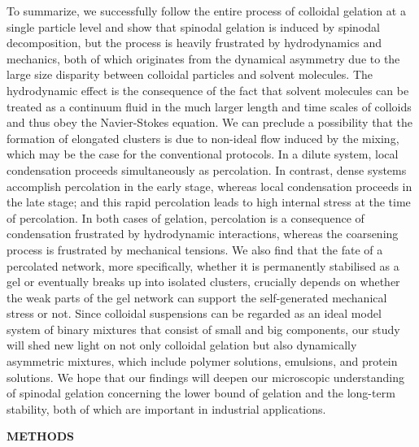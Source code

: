 \documentclass[preprint,footinbib,amsmath,amssymb]{revtex4}
\begin{document}
To summarize, we successfully follow the entire process of colloidal gelation at a single particle level and 
show that spinodal gelation is induced by spinodal decomposition, but the process is heavily frustrated  by 
hydrodynamics and mechanics, both of which originates from the dynamical asymmetry due to the large size disparity between 
colloidal particles and solvent molecules. The hydrodynamic effect is the consequence of the fact that solvent molecules 
can be treated as a continuum fluid in the much larger length and time scales of colloids and thus obey the Navier-Stokes equation. 
We can preclude a possibility that the formation of elongated clusters is due to non-ideal flow induced by the mixing, which may be the case for the conventional protocols. 
In a dilute system, local condensation proceeds simultaneously as percolation.
In contrast, dense systems accomplish percolation in the early stage, whereas local condensation proceeds in the late stage; and this rapid percolation leads to high internal stress at the time of percolation. 
In both cases of gelation, percolation is a consequence of condensation frustrated by hydrodynamic interactions, whereas the coarsening process is frustrated by mechanical tensions.
We also find that the fate of a percolated network, more specifically, whether it is permanently stabilised as a gel or eventually breaks up into isolated clusters, 
crucially depends on whether the weak parts of the gel network can support the self-generated mechanical stress or not. 
Since colloidal suspensions can be regarded as an ideal model system of binary mixtures that consist of small and big components, 
our study will shed new light on not only colloidal gelation but also dynamically asymmetric mixtures, which include polymer solutions, emulsions, and protein solutions. 
We hope that our findings will deepen our microscopic understanding of spinodal gelation concerning the lower bound of gelation and the long-term stability, both of 
which are important in industrial applications.   


\vspace{1cm}
\noindent
{\bf METHODS}
\end{document}
